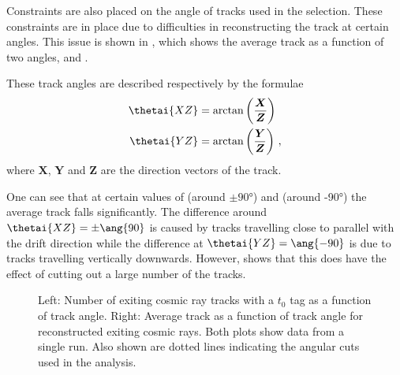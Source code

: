 Constraints are also placed on the angle of tracks used in the selection.
These constraints are in place due to difficulties in reconstructing the track \dqdx at certain angles.
This issue is shown in , which shows the average track \dqdx as a function of two angles,  and .

These track angles are described respectively by the formulae
\begin{align}
	\thetai{XZ}	&= \arctan \left( \frac{\boldsymbol{X}}{\boldsymbol{Z}} \right) \\
	\thetai{YZ} &= \arctan \left( \frac{\boldsymbol{Y}}{\boldsymbol{Z}} \right) \, ,
\end{align}	
where $\boldsymbol{X}$, $\boldsymbol{Y}$ and $\boldsymbol{Z}$ are the direction vectors of the track.

One can see that at certain values of  (around $\pm\ang{90}$) and  (around \ang{-90}) the average track \dqdx falls significantly.
The difference around $\thetai{XZ} = \pm \ang{90}$ is caused by tracks travelling close to parallel with the drift direction while the difference at $\thetai{YZ} = \ang{-90}$ is due to tracks travelling vertically downwards.
However,  shows that this does have the effect of cutting out a large number of the tracks.

\begin{figure}[h]
	\begin{minipage}[t]{.5\linewidth}
		\begin{adjustbox}{max totalsize=\linewidth, center}
			
		\end{adjustbox}
	\end{minipage}
	\begin{minipage}[t]{.5\linewidth}		
		\begin{adjustbox}{max totalsize=\linewidth, center}
			
		\end{adjustbox}
	\end{minipage}
	\caption[Number of tracks and average track \dqdx as a function of track angle for exiting cosmic rays.]{Left: Number of exiting cosmic ray tracks with a $t_{0}$ tag as a function of track angle. Right: Average track \dqdx as a function of track angle for reconstructed exiting cosmic rays. Both plots show data from a single run. Also shown are dotted lines indicating the angular cuts used in the analysis.}
	\label{fig:dqdxAng}
\end{figure}

